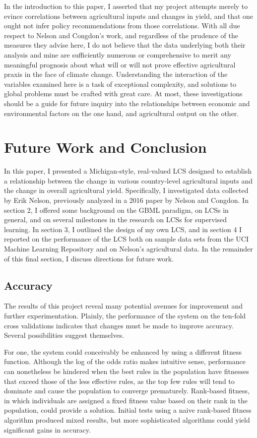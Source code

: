 \documentclass[12pt,twoside]{article}
\begin{document}
In the introduction to this paper, I asserted that my project attempts merely to evince correlations between agricultural inputs and changes in yield, and that one ought not infer policy recommendations from those correlations. With all due respect to Nelson and Congdon's work, and regardless of the prudence of the measures they advise here, I do not believe that the data underlying both their analysis and mine are sufficiently numerous or comprehensive to merit any meaningful prognosis about what will or will not prove effective agricultural praxis in the face of climate change. Understanding the interaction of the variables examined here is a task of exceptional complexity, and solutions to global problems must be crafted with great care. At most, these investigations should be a guide for future inquiry into the relationships between economic and environmental factors on the one hand, and agricultural output on the other.

\section{Future Work and Conclusion}

In this paper, I presented a Michigan-style, real-valued LCS designed to establish a relationship between the change in various country-level agricultural inputs and the change in overall agricultural yield. Specifically, I investigated data collected by Erik Nelson, previously analyzed in a 2016 paper by Nelson and Congdon. In section 2, I offered some background on the GBML paradigm, on LCSs in general, and on several milestones in the research on LCSs for supervised learning. In section 3, I outlined the design of my own LCS, and in section 4 I reported on the performance of the LCS both on sample data sets from the UCI Machine Learning Repository and on Nelson's agricultural data. In the remainder of this final section, I discuss directions for future work.

\subsection{Accuracy}
The results of this project reveal many potential avenues for improvement and further experimentation. Plainly, the performance of the system on the ten-fold cross validations indicates that changes must be made to improve accuracy. Several possibilities suggest themselves. 

For one, the system could conceivably be enhanced by using a different fitness function. Although the log of the odds ratio makes intuitive sense, performance can nonetheless be hindered when the best rules in the population have fitnesses that exceed those of the less effective rules, as the top few rules will tend to dominate and cause the population to converge prematurely. Rank-based fitness, in which individuals are assigned a fixed fitness value based on their rank in the population, could provide a solution. Initial tests using a naive rank-based fitness algorithm produced mixed results, but more sophisticated algorithms could yield significant gains in accuracy.
\end{document}
